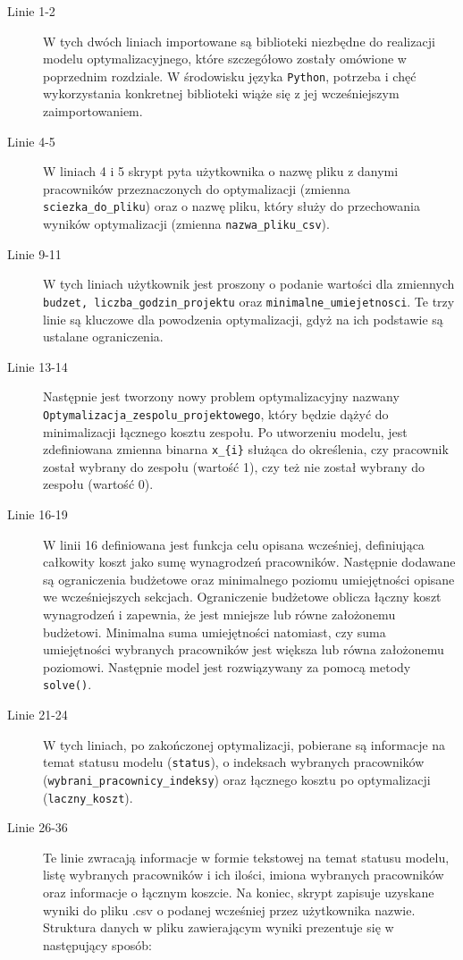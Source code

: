     \begin{description}
        \item[Linie 1-2] W tych dwóch liniach importowane są biblioteki niezbędne do realizacji modelu optymalizacyjnego, które szczegółowo zostały omówione w poprzednim rozdziale. W środowisku języka \verb|Python|, potrzeba i chęć wykorzystania konkretnej biblioteki wiąże się z jej wcześniejszym zaimportowaniem.
        \item[Linie 4-5] W liniach 4 i 5 skrypt pyta użytkownika o nazwę pliku z danymi pracowników przeznaczonych do optymalizacji (zmienna \verb|sciezka_do_pliku|) oraz o nazwę pliku, który służy do przechowania wyników optymalizacji (zmienna \verb|nazwa_pliku_csv|).
        \item[Linie 9-11] W tych liniach użytkownik jest proszony o podanie wartości dla zmiennych \verb|budzet, liczba_godzin_projektu| oraz \verb|minimalne_umiejetnosci|. Te trzy linie są kluczowe dla powodzenia optymalizacji, gdyż na ich podstawie są ustalane ograniczenia.
        \item[Linie 13-14] Następnie jest tworzony nowy problem optymalizacyjny nazwany \verb|Optymalizacja_zespolu_projektowego|, który będzie dążyć do minimalizacji łącznego kosztu zespołu. Po utworzeniu modelu, jest zdefiniowana zmienna binarna \verb|x_{i}| służąca do określenia, czy pracownik został wybrany do zespołu (wartość 1), czy też nie został wybrany do zespołu (wartość 0).
        \item[Linie 16-19] W linii 16 definiowana jest funkcja celu opisana wcześniej, definiująca całkowity koszt jako sumę wynagrodzeń pracowników. Następnie dodawane są ograniczenia budżetowe oraz minimalnego poziomu umiejętności opisane we wcześniejszych sekcjach. Ograniczenie budżetowe oblicza łączny koszt wynagrodzeń i zapewnia, że jest mniejsze lub równe założonemu budżetowi. Minimalna suma umiejętności natomiast, czy suma umiejętności wybranych pracowników jest większa lub równa założonemu poziomowi. Następnie model jest rozwiązywany za pomocą metody \verb|solve()|.
        \item[Linie 21-24] W tych liniach, po zakończonej optymalizacji, pobierane są informacje na temat statusu modelu (\verb|status|), o indeksach wybranych pracowników (\verb|wybrani_pracownicy_indeksy|) oraz łącznego kosztu po optymalizacji (\verb|laczny_koszt|).
        \item[Linie 26-36] Te linie zwracają informacje w formie tekstowej na temat statusu modelu, listę wybranych pracowników i ich ilości, imiona wybranych pracowników oraz informacje o łącznym koszcie. Na koniec, skrypt zapisuje uzyskane wyniki do pliku .csv o podanej wcześniej przez użytkownika nazwie. Struktura danych w pliku zawierającym wyniki prezentuje się w następujący sposób: 

\end{description}
